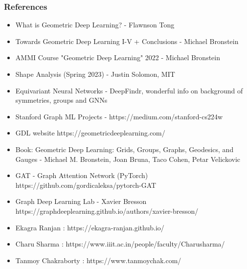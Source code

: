 \begin{frame}[fragile]\frametitle{References}

\begin{itemize}
\item What is Geometric Deep Learning? - Flawnson Tong
\item Towards Geometric Deep Learning I-V + Conclusions - Michael Bronstein
\item AMMI Course "Geometric Deep Learning" 2022 - Michael Bronstein
\item Shape Analysis (Spring 2023) -  Justin Solomon, MIT
\item Equivariant Neural Networks - DeepFindr, wonderful info on background of symmetries, groups and GNNs
\item Stanford Graph ML Projects - https://medium.com/stanford-cs224w
\item GDL website https://geometricdeeplearning.com/
\item Book: Geometric Deep Learning: Grids, Groups, Graphs, Geodesics, and Gauges - Michael M. Bronstein, Joan Bruna, Taco Cohen, Petar Velickovic
\item GAT - Graph Attention Network (PyTorch) https://github.com/gordicaleksa/pytorch-GAT
\item Graph Deep Learning Lab - Xavier Bresson https://graphdeeplearning.github.io/authors/xavier-bresson/
\item Ekagra Ranjan : https://ekagra-ranjan.github.io/
\item Charu Sharma : https://www.iiit.ac.in/people/faculty/Charusharma/
\item Tanmoy Chakraborty : https://www.tanmoychak.com/
\end{itemize}
	  
\end{frame}

